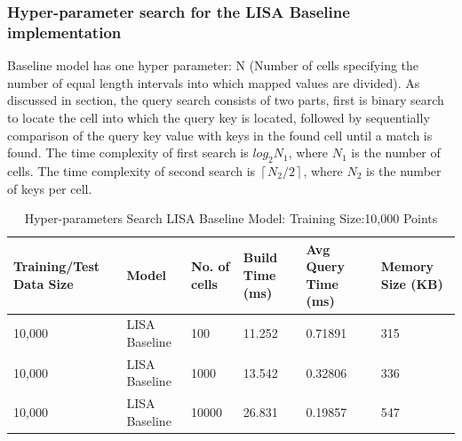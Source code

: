 \subsubsection {Hyper-parameter search for the LISA Baseline implementation}
Baseline model has one hyper parameter: N (Number of cells specifying the number of equal length intervals into which mapped values are divided). As discussed in section, the query search consists of two parts, first is binary search to locate the cell into which the query key is located, followed by sequentially comparison of the query key value with keys in the found cell until a match is found. The time complexity of first search is $log_{2}N_{1}$, where $N_{1}$ is the number of cells. The time complexity of second search is  $ \left \lceil {N_{2} / 2}\right \rceil $, where $N_{2}$ is the number of keys per cell.

\begin{table}[ht]
	\centering
	\begin{tabular}{||p{}<{\centering}|p{}<{\centering}| p{}<{\centering}|p{}<{\centering}|p{}<{\centering}|p{}<{\centering}||}
		\hline
		Training/Test Data Size& Model & No. of cells & Build Time (ms) & Avg Query Time (ms) & Memory Size (KB)\\ [0.5ex] 
		\hline
		\hline
		10,000& LISA Baseline & 100 & 11.252 & 0.71891 & 315\\
		\hline
		10,000& LISA Baseline & 1000 & 13.542 & 0.32806 & 336\\
		\hline
		10,000& LISA Baseline & 10000 &26.831 & 0.19857 & 547\\
		\hline
		\hline
	\end{tabular}
    \caption{Hyper-parameters Search LISA Baseline Model: Training Size:10,000 Points}
    \label{small_lognormal_lisa_baseline_10000}
\end{table}

